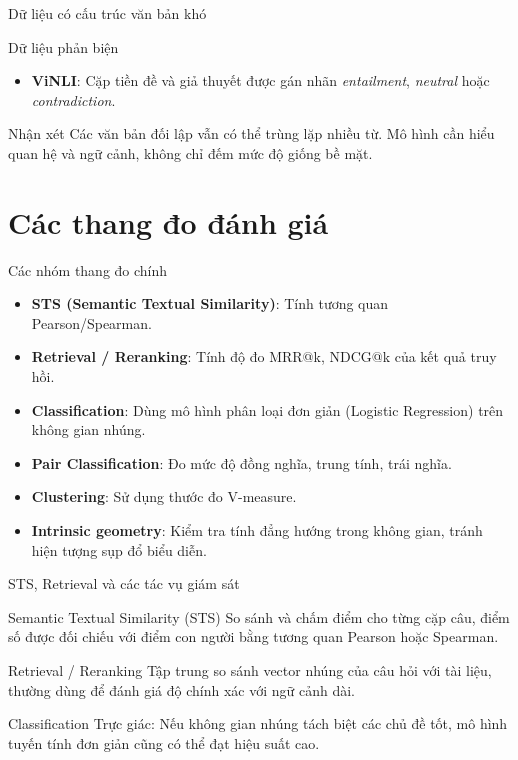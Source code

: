 \documentclass[aspectratio=169,10pt]{beamer}
\begin{document}
\begin{frame}{Dữ liệu có cấu trúc văn bản khó}
    \begin{block}{Dữ liệu phản biện}
        \begin{itemize}
            \item \textbf{ViNLI}: Cặp tiền đề và giả thuyết được gán nhãn \textit{entailment}, \textit{neutral} hoặc \textit{contradiction}.
        \end{itemize}
    \end{block}
    \begin{block}{Nhận xét}
        Các văn bản đối lập vẫn có thể trùng lặp nhiều từ. Mô hình cần hiểu quan hệ và ngữ cảnh, không chỉ đếm mức độ giống bề mặt.
    \end{block}
\end{frame}

\section{Các thang đo đánh giá}
\begin{frame}{Các nhóm thang đo chính}
    \begin{itemize}
        \item \textbf{STS (Semantic Textual Similarity)}: Tính tương quan Pearson/Spearman.
        \item \textbf{Retrieval / Reranking}: Tính độ đo MRR@k, NDCG@k của kết quả truy hồi.
        \item \textbf{Classification}: Dùng mô hình phân loại đơn giản (Logistic Regression) trên không gian nhúng.
        \item \textbf{Pair Classification}: Đo mức độ đồng nghĩa, trung tính, trái nghĩa.
        \item \textbf{Clustering}: Sử dụng thước đo V-measure.
        \item \textbf{Intrinsic geometry}: Kiểm tra tính đẳng hướng trong không gian, tránh hiện tượng sụp đổ biểu diễn.

    \end{itemize}
\end{frame}

\begin{frame}{STS, Retrieval và các tác vụ giám sát}
    \begin{block}{Semantic Textual Similarity (STS)}
        So sánh và chấm điểm cho từng cặp câu, điểm số được đối chiếu với điểm con người bằng tương quan Pearson hoặc Spearman.
    \end{block}
    \begin{block}{Retrieval / Reranking}
        Tập trung so sánh vector nhúng của câu hỏi với tài liệu, thường dùng để đánh giá độ chính xác với ngữ cảnh dài.
    \end{block}
    \begin{block}{Classification}
        Trực giác: Nếu không gian nhúng tách biệt các chủ đề tốt, mô hình tuyến tính đơn giản cũng có thể đạt hiệu suất cao.
    \end{block}
\end{frame}
\end{document}

